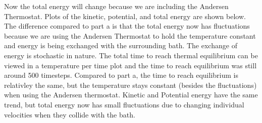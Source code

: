 \documentclass{article}
\begin{document}
	Now the total energy will change because we are including the Andersen Thermostat. Plots of the kinetic, potential, and total energy are shown below. The difference compared to part a is that the total energy now has fluctuations because we are using the Andersen Thermostat to hold the temperature constant and energy is being exchanged with the surrounding bath. The exchange of energy is stochastic in nature. The total time to reach thermal equilibrium can be viewed in a temperature per time plot and the time to reach equilibrium was still around 500 timesteps. Compared to part a, the time to reach equilibrium is relativley the same, but the temperature stays constant (besides the fluctuations) when using the Andersen thermostat. Kinetic and Potential energy have the same trend, but total energy now has small fluctuations due to changing individual velocities when they collide with the bath.

 
\end{document}
